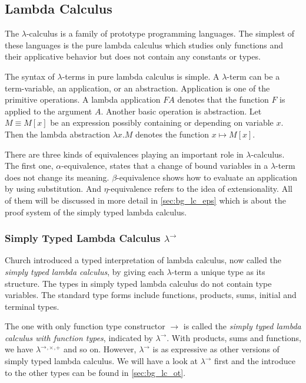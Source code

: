 \subsection{Lambda Calculus}
\label{sec:bg_lc}
The $ \lambda $-calculus is a family of prototype programming languages. The simplest of these languages is the pure lambda calculus which studies only functions and their applicative behavior but does not contain any constants or types.

The syntax of $ \lambda $-terms in pure lambda calculus is simple. A $ \lambda $-term can be a term-variable, an application, or an abstraction. Application is one of the primitive operations. A lambda application $ F A $ denotes that the function $ F $ is applied to the argument $ A $. Another basic operation is abstraction. Let $ M \equiv M[x] $ be an expression possibly containing or depending on variable $ x $. Then the lambda abstraction $ \lambda x.M $ denotes the function $ x \mapsto M[x] $.

There are three kinds of equivalences playing an important role in $ \lambda $-calculus. The first one, $ \alpha $-equivalence, states that a change of bound variables in a $ \lambda $-term does not change its meaning. $ \beta $-equivalence shows how to evaluate an application by using substitution. And $ \eta $-equivalence refers to the idea of extensionality. All of them will be discussed in more detail in \ref{sec:bg_lc_eps} which is about the proof system of the simply typed lambda calculus.


\subsubsection{Simply Typed Lambda Calculus $ \lambda ^\to $}
\label{sec:bg_lc_stlc}
Church introduced a typed interpretation of lambda calculus, now called the \emph{simply typed lambda calculus}, by giving each $ \lambda $-term a unique type as its structure. The types in simply typed lambda calculus do not contain type variables. The standard type forms include functions, products, sums, initial and terminal types.

The one with only function type constructor $ \to $ is called the \emph{simply typed lambda calculus with function types}, indicated by $ \lambda ^\to $. With products, sums and functions, we have $ \lambda ^\to{}^,{}^\times{}^,{}^+ $ and so on. However, $ \lambda ^\to $ is as expressive as other versions of simply typed lambda calculus. We will have a look at $ \lambda ^\to $ first and the introduce to the other types can be found in \ref{sec:bg_lc_ot}.

